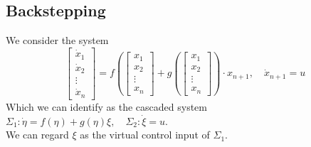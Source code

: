 \subsection{Backstepping}
We consider the system
\begin{equation}
\left[\begin{array}{c}{\dot{x}_{1}} \\ {\dot{x}_{2}} \\ {\vdots} \\ {\dot{x}_{n}}\end{array}\right]=f\left(\left[\begin{array}{c}{x_{1}} \\ {x_{2}} \\ {\vdots} \\ {x_{n}}\end{array}\right]+g\left(\left[\begin{array}{c}{x_{1}} \\ {x_{2}} \\ {\vdots} \\ {x_{n}}\end{array}\right]\right) \cdot x_{n+1}\right., \quad
    \dot{x}_{n+1}=u
\end{equation}
Which we can identify as the cascaded system ${\Sigma_{1}:} {\dot{\eta}=f(\eta)+g(\eta) \xi}, \quad {\Sigma_{2}:} {\dot{\xi}=u}$. \\ We can regard $\xi$ as the virtual control input of $\Sigma_1$.

